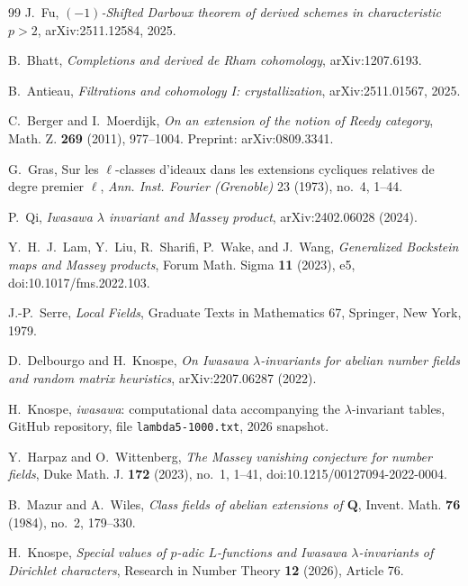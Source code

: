 \documentclass[11pt]{article}
\theoremstyle{remark}
\providecommand{\Q}{\mathbf Q}
\begin{document}
\begin{thebibliography}{99}
J.~Fu,
\emph{$(-1)$-Shifted Darboux theorem of derived schemes in characteristic $p>2$},
arXiv:2511.12584, 2025.

B.~Bhatt,
\emph{Completions and derived de Rham cohomology},
arXiv:1207.6193.

B.~Antieau,
\emph{Filtrations and cohomology I: crystallization},
arXiv:2511.01567, 2025.

C.~Berger and I.~Moerdijk,
\emph{On an extension of the notion of Reedy category},
Math. Z. \textbf{269} (2011), 977--1004.
Preprint: arXiv:0809.3341.

G.~Gras,
Sur les $\ell$-classes d'ideaux dans les extensions cycliques relatives de degre premier $\ell$,
\emph{Ann. Inst. Fourier (Grenoble)} 23 (1973), no.~4, 1--44.

P.~Qi,
\emph{Iwasawa $\lambda$ invariant and Massey product},
arXiv:2402.06028 (2024).

Y.~H.~J.~Lam, Y.~Liu, R.~Sharifi, P.~Wake, and J.~Wang,
\emph{Generalized Bockstein maps and Massey products},
Forum Math. Sigma \textbf{11} (2023), e5,
doi:10.1017/fms.2022.103.

J.-P.~Serre,
\emph{Local Fields},
Graduate Texts in Mathematics 67,
Springer, New York, 1979.

D.~Delbourgo and H.~Knospe,
\emph{On Iwasawa $\lambda$-invariants for abelian number fields and random matrix heuristics},
arXiv:2207.06287 (2022).

H.~Knospe,
\emph{iwasawa}: computational data accompanying the $\lambda$-invariant tables,
GitHub repository, file \texttt{lambda5-1000.txt}, 2026 snapshot.

Y.~Harpaz and O.~Wittenberg,
\emph{The Massey vanishing conjecture for number fields},
Duke Math. J. \textbf{172} (2023), no.~1, 1--41,
doi:10.1215/00127094-2022-0004.

B.~Mazur and A.~Wiles,
\emph{Class fields of abelian extensions of $\Q$},
Invent. Math. \textbf{76} (1984), no.~2, 179--330.

H.~Knospe,
\emph{Special values of \(p\)-adic \(L\)-functions and Iwasawa
\(\lambda\)-invariants of Dirichlet characters},
Research in Number Theory \textbf{12} (2026), Article 76.


\end{thebibliography}
\end{document}
